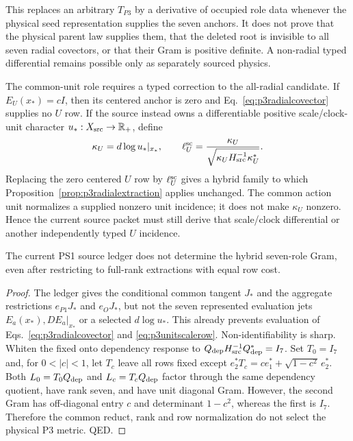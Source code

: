 This replaces an arbitrary $T_{P3}$ by a derivative of occupied role data
whenever the physical seed representation supplies the seven anchors.  It
does not prove that the physical parent law supplies them, that the deleted root is invisible
to all seven radial covectors, or that their Gram is positive definite.  A
non-radial typed differential remains possible only as separately sourced
physics.

The common-unit role requires a typed correction to the all-radial candidate.
If $E_U(x_*)=cI$, then its centered anchor is zero and
Eq.~\eqref{eq:p3radialcovector} supplies no $U$ row.  If the source instead
owns a differentiable positive scale/clock-unit character
$u_*:X_{\rm src}\to\mathbb R_+$, define
\begin{equation}
\kappa_U=d\log u_*|_{x_*},
\qquad
\ell_U^{\rm sc}=\frac{\kappa_U}
{\sqrt{\kappa_UH_{\rm src}^{-1}\kappa_U^*}}.
\label{eq:p3unitscalerow}
\end{equation}
Replacing the zero centered $U$ row by $\ell_U^{\rm sc}$ gives a hybrid
family to which Proposition~\ref{prop:p3radialextraction} applies unchanged.
The common action unit normalizes a supplied nonzero unit incidence; it does
not make $\kappa_U$ nonzero.  Hence the current source packet must still
derive that scale/clock differential or another independently typed $U$
incidence.

\begin{proposition}
\label{prop:p3currentevaluability}
The current PS1 source ledger does not determine the hybrid seven-role Gram,
even after restricting to full-rank extractions with equal row cost.
\end{proposition}

\begin{proof}
The ledger gives the conditional common tangent $J_*$ and the aggregate
restrictions $e_{P1}J_*$ and $e_OJ_*$, but not the seven represented
evaluation jets $E_a(x_*),DE_a|_{x_*}$ or a selected $d\log u_*$.  This
already prevents evaluation of Eqs.~\eqref{eq:p3radialcovector} and
\eqref{eq:p3unitscalerow}.  Non-identifiability is sharp.  Whiten the fixed
onto dependency response to
$Q_{\rm dep}H_{\rm src}^{-1}Q_{\rm dep}^*=I_7$.  Set $T_0=I_7$ and, for
$0<|c|<1$, let $T_c$ leave all rows fixed except
$e_2^*T_c=ce_1^*+\sqrt{1-c^2}\,e_2^*$.  Both
$L_0=T_0Q_{\rm dep}$ and $L_c=T_cQ_{\rm dep}$ factor through the same
dependency quotient, have rank seven, and have unit diagonal Gram.  However,
the second Gram has off-diagonal entry $c$ and determinant $1-c^2$, whereas
the first is $I_7$.  Therefore the common reduct, rank and row normalization
do not select the physical P3 metric.  QED.
\end{proof}

